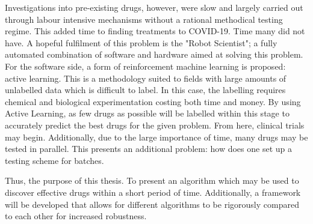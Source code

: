 Investigations into pre-existing drugs, however, were slow and largely carried out through labour intensive mechanisms without a rational methodical testing regime. This added time to finding treatments to \mbox{COVID-19}. Time many did not have. A hopeful fulfilment of this problem is the "Robot Scientist"; a fully automated combination of software and hardware aimed at solving this problem. For the software side, a form of reinforcement machine learning is proposed: active learning. This is a methodology suited to fields with large amounts of unlabelled data which is difficult to label. In this case, the labelling requires chemical and biological experimentation costing both time and money. By using Active Learning, as few drugs as possible will be labelled within this stage to accurately predict the best drugs for the given problem. From here, clinical trials may begin. Additionally, due to the large importance of time, many drugs may be tested in parallel. This presents an additional problem: how does one set up a testing scheme for batches.

Thus, the purpose of this thesis. To present an algorithm which may be used to discover effective drugs within a short period of time. Additionally, a framework will be developed that allows for different algorithms to be rigorously compared to each other for increased robustness.